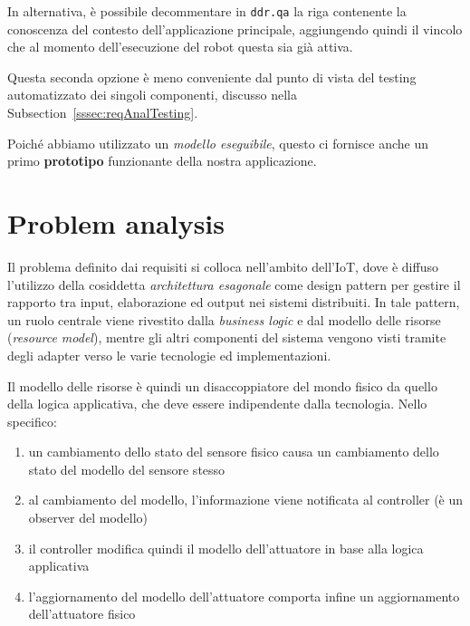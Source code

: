 \documentclass{../llncs}
\newcommand{\codescript}[1]{{\mbox{\small{\texttt{#1}}}}\xspace}
\newcommand{\labelsec}[1]{\label{sec:#1}}
\newcommand{\xsss}[1]{\subsectionname~\ref{sssec:#1}}
\newcommand{\subsectionname}{Subsection}
\begin{document}


In alternativa, è possibile decommentare in \codescript{ddr.qa} la riga contenente la conoscenza del contesto dell'applicazione principale, aggiungendo quindi il vincolo che al momento dell'esecuzione del robot questa sia già attiva.

Questa seconda opzione è meno conveniente dal punto di vista del testing automatizzato dei singoli componenti, discusso nella \xsss{reqAnalTesting}.\\

\vspace{8px}

Poiché abbiamo utilizzato un \emph{modello eseguibile}, questo ci fornisce anche un primo \textbf{prototipo} funzionante della nostra applicazione.

\section{Problem analysis}
\labelsec{ProblemAnalysis}
Il problema definito dai requisiti si colloca nell'ambito dell'IoT, dove è diffuso l'utilizzo della cosiddetta \emph{architettura esagonale} come design pattern per gestire il rapporto tra input, elaborazione ed output nei sistemi distribuiti. In tale pattern, un ruolo centrale viene rivestito dalla \emph{business logic} e dal modello delle risorse (\emph{resource model}), mentre gli altri componenti del sistema vengono visti tramite degli adapter verso le varie tecnologie ed implementazioni.

Il modello delle risorse è quindi un disaccoppiatore del mondo fisico da quello della logica applicativa, che deve essere indipendente dalla tecnologia. Nello specifico:
\begin{enumerate}
\item un cambiamento dello stato del sensore fisico causa un cambiamento dello stato del modello del sensore stesso
\item al cambiamento del modello, l'informazione viene notificata al controller (è un observer del modello)
\item il controller modifica quindi il modello dell'attuatore in base alla logica applicativa
\item l'aggiornamento del modello dell'attuatore comporta infine un aggiornamento dell'attuatore fisico
\end{enumerate}
\end{document}
